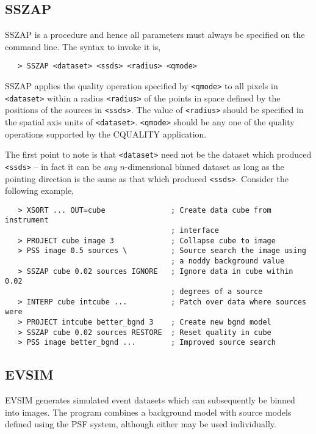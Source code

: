 \subsection{SSZAP}
\label{sszap}
SSZAP is a procedure and hence all parameters must always be specified on
the command line. The syntax to invoke it is,
\begin{verbatim}
   > SSZAP <dataset> <ssds> <radius> <qmode>
\end{verbatim}
SSZAP applies the quality operation specified by \verb+<qmode>+ to all
pixels in \verb+<dataset>+ within a radius \verb+<radius>+ of the points
in space defined by the positions of the sources in \verb+<ssds>+. The
value of \verb+<radius>+ should be specified in the spatial axis units
of \verb+<dataset>+. \verb+<qmode>+ should be any one of the quality
operations supported by the CQUALITY application.

The first point to note is that \verb+<dataset>+ need not be the dataset
which produced \verb+<ssds>+ -- in fact it can be {\em any} $n$-dimensional
binned dataset as long as the pointing direction is the same as that
which produced \verb+<ssds>+. Consider the following example,
\begin{verbatim}
   > XSORT ... OUT=cube               ; Create data cube from instrument
                                      ; interface
   > PROJECT cube image 3             ; Collapse cube to image
   > PSS image 0.5 sources \          ; Source search the image using
                                      ; a noddy background value
   > SSZAP cube 0.02 sources IGNORE   ; Ignore data in cube within 0.02
                                      ; degrees of a source
   > INTERP cube intcube ...          ; Patch over data where sources were
   > PROJECT intcube better_bgnd 3    ; Create new bgnd model 
   > SSZAP cube 0.02 sources RESTORE  ; Reset quality in cube
   > PSS image better_bgnd ...        ; Improved source search
\end{verbatim}



\subsection{EVSIM}

\PARtabstart
{}
\PARtabend
EVSIM generates simulated event datasets which can subsequently be binned
into images. The program combines a background model with source models
defined using the PSF system, although either may be used individually.

